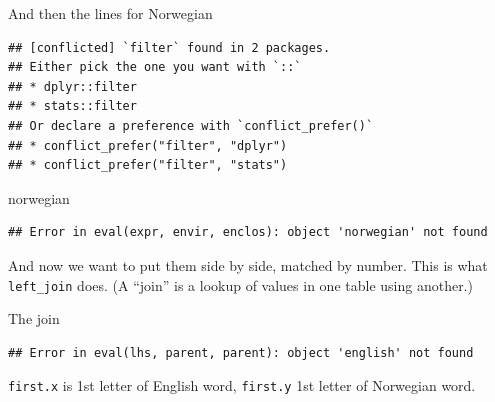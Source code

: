 \documentclass[ignorenonframetext,]{beamer}
\newenvironment{Shaded}{\begin{snugshade}}{\end{snugshade}}
\newcommand{\DataTypeTok}[1]{\textcolor[rgb]{0.13,0.29,0.53}{#1}}
\newcommand{\KeywordTok}[1]{\textcolor[rgb]{0.13,0.29,0.53}{\textbf{#1}}}
\newcommand{\NormalTok}[1]{#1}
\newcommand{\OperatorTok}[1]{\textcolor[rgb]{0.81,0.36,0.00}{\textbf{#1}}}
\newcommand{\StringTok}[1]{\textcolor[rgb]{0.31,0.60,0.02}{#1}}
\begin{document}
\begin{frame}[fragile]{And then the lines for Norwegian}
\protect\hypertarget{and-then-the-lines-for-norwegian}{}

\begin{Shaded}
\end{Shaded}

\begin{verbatim}
## [conflicted] `filter` found in 2 packages.
## Either pick the one you want with `::` 
## * dplyr::filter
## * stats::filter
## Or declare a preference with `conflict_prefer()`
## * conflict_prefer("filter", "dplyr")
## * conflict_prefer("filter", "stats")
\end{verbatim}

\begin{Shaded}
\begin{Highlighting}[]
\NormalTok{norwegian}
\end{Highlighting}
\end{Shaded}

\begin{verbatim}
## Error in eval(expr, envir, enclos): object 'norwegian' not found
\end{verbatim}

And now we want to put them side by side, matched by number. This is
what \texttt{left\_join} does. (A ``join'' is a lookup of values in one
table using another.)

\end{frame}

\begin{frame}[fragile]{The join}
\protect\hypertarget{the-join}{}

\begin{Shaded}
\end{Shaded}

\begin{verbatim}
## Error in eval(lhs, parent, parent): object 'english' not found
\end{verbatim}

\texttt{first.x} is 1st letter of English word, \texttt{first.y} 1st
letter of Norwegian word.

\end{frame}
\end{document}
